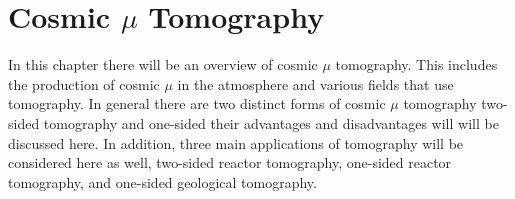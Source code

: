 
\chapter{Cosmic $\mu$ Tomography}\label{chp:cosmicMuTelescopes}

\ifpdf
    \graphicspath{{Chapter5/Figs/Raster/}{Chapter5/Figs/PDF/}{Chapter5/Figs/}}
\else
    \graphicspath{{Chapter5/Figs/Vector/}{Chapter5/Figs/}}
\fi



In this chapter there will be an overview of cosmic $\mu$ tomography. This includes the production of cosmic $\mu$ in the atmosphere and various fields that use tomography. In general there are two distinct forms of cosmic $\mu$ tomography two-sided tomography and one-sided their advantages and disadvantages will will be discussed here. In addition, three main applications of tomography will be considered here as well, two-sided reactor tomography, one-sided reactor tomography, and one-sided geological tomography.

